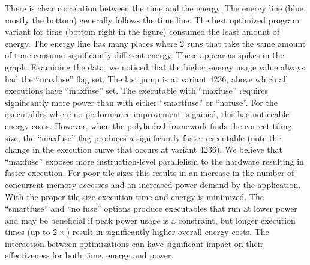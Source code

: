 There is clear correlation between the time and the energy. The
energy line (blue, mostly the bottom) generally follows the time line.  
The best optimized program variant for time (bottom right in the figure)  
consumed the least amount of energy. The energy line has many places 
where 2 runs that take the same amount of time consume significantly different
energy. These appear as spikes in the graph. Examining the data,
we noticed that the higher energy usage value always had the ``maxfuse'' flag set.
The last jump is at variant 4236, above which all executions have ``maxfuse'' set.
The executable with ``maxfuse'' requires significantly more power than 
with either ``smartfuse'' or ``nofuse''.  For the executables where
no performance improvement is gained, this has noticeable energy costs.  However,
when the polyhedral framework finds the correct tiling size, the ``maxfuse''
flag produces a significantly faster executable (note the change in the
execution curve that occurs at variant 4236).
We believe that ``maxfuse'' exposes more instruction-level  parallelism to the hardware
resulting in faster execution. For poor tile sizes this results in an increase in the number of
concurrent memory accesses and an increased power demand by the application. With the proper
tile size execution time and energy is minimized.
The ``smartfuse'' and ``no fuse'' options produce executables that run at lower power and may be beneficial if
peak power usage is a constraint, but longer execution times (up to $2\times$) result
in significantly higher overall energy costs.
The interaction between optimizations can have significant impact on
their effectiveness for both time, energy and power.


